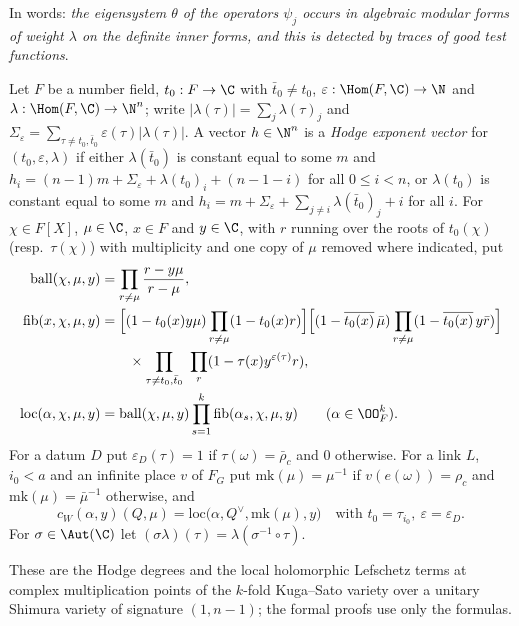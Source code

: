In words: \emph{the eigensystem $\theta$ of the operators $\psi_j$ occurs in algebraic modular forms of weight $\lambda$ on the
definite inner forms, and this is detected by traces of good test functions}.

\begin{definition}\label{pf:ks1:def-hexp}
Let $F$ be a number field, $t_0:F\to\C$ with $\bar t_0\neq t_0$, $\varepsilon:\Hom(F,\C)\to\N$ and
$\lambda:\Hom(F,\C)\to\N^n$; write $|\lambda(\tau)|=\sum_j\lambda(\tau)_j$ and $\Sigma_\varepsilon=\sum_{\tau\neq t_0,\bar t_0}
\varepsilon(\tau)|\lambda(\tau)|$. A vector $h\in\N^n$ is a \emph{Hodge exponent vector} for $(t_0,\varepsilon,\lambda)$ if
either $\lambda(\bar t_0)$ is constant equal to some $m$ and $h_i=(n-1)m+\Sigma_\varepsilon+\lambda(t_0)_i+(n-1-i)$ for all
$0\le i<n$, or $\lambda(t_0)$ is constant equal to some $m$ and $h_i=m+\Sigma_\varepsilon+\sum_{j\neq i}\lambda(\bar t_0)_j+i$ for all
$i$. For $\chi\in F[X]$, $\mu\in\C$, $x\in F$ and $y\in\C$, with $r$ running over the roots of $t_0(\chi)$ (resp.\ $\tau(\chi)$)
with multiplicity and one copy of $\mu$ removed where indicated, put
\begin{align*}
\mathrm{ball}(\chi,\mu,y)&=\prod_{r\neq\mu}\frac{r-y\mu}{r-\mu},\\
\mathrm{fib}(x,\chi,\mu,y)&=\Bigl[(1-t_0(x)y\mu)\prod_{r\neq\mu}(1-t_0(x)r)\Bigr]\Bigl[(1-\overline{t_0(x)}\,\bar\mu)
  \prod_{r\neq\mu}(1-\overline{t_0(x)}\,y\bar r)\Bigr]\\
  &\qquad\times\prod_{\tau\neq t_0,\bar t_0}\ \prod_{r}(1-\tau(x)y^{\varepsilon(\tau)}r),\\
\mathrm{loc}(\alpha,\chi,\mu,y)&=\mathrm{ball}(\chi,\mu,y)\prod_{s=1}^k\mathrm{fib}(\alpha_s,\chi,\mu,y)\qquad(\alpha\in\OO_F^k).
\end{align*}
For a datum $D$ put $\varepsilon_D(\tau)=1$ if $\tau(\omega)=\bar\rho_c$ and $0$ otherwise. For a link $L$, $i_0<a$ and an infinite
place $v$ of $F_G$ put $\mathrm{mk}(\mu)=\mu^{-1}$ if $v(e(\omega))=\rho_c$ and $\mathrm{mk}(\mu)=\bar\mu^{-1}$ otherwise, and
\[c_W(\alpha,y)(Q,\mu)=\mathrm{loc}\bigl(\alpha,{Q}^\vee,\mathrm{mk}(\mu),y\bigr)\quad\text{with }t_0=\tau_{i_0},\ \varepsilon=\varepsilon_D.\]
For $\sigma\in\Aut(\C)$ let $(\sigma\lambda)(\tau)=\lambda(\sigma^{-1}\circ\tau)$.
\end{definition}

These are the Hodge degrees and the local holomorphic Lefschetz terms at complex multiplication points of the $k$-fold
Kuga--Sato variety over a unitary Shimura variety of signature $(1,n-1)$; the formal proofs use only the formulas.

